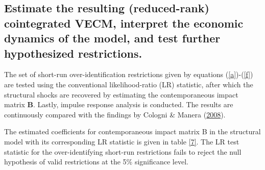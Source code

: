 \documentclass[11pt,preprint, authoryear]{elsarticle}
\numberwithin{equation}{section}
\numberwithin{figure}{section}
\numberwithin{table}{section}
\begin{document}
\hypertarget{estimate-the-resulting-reduced-rank-cointegrated-vecm-interpret-the-economic-dynamics-of-the-model-and-test-further-hypothesized-restrictions.}{%
\subsection{\texorpdfstring{Estimate the resulting (reduced-rank)
cointegrated VECM, interpret the economic dynamics of the model, and
test further hypothesized restrictions.
\label{step4}}{Estimate the resulting (reduced-rank) cointegrated VECM, interpret the economic dynamics of the model, and test further hypothesized restrictions. }}\label{estimate-the-resulting-reduced-rank-cointegrated-vecm-interpret-the-economic-dynamics-of-the-model-and-test-further-hypothesized-restrictions.}}

The set of short-run over-identification restrictions given by equations
(\ref{a})-(\ref{f}) are tested using the conventional likelihood-ratio
(LR) statistic, after which the structural shocks are recovered by
estimating the contemporaneous impact matrix \(\bm{B}\). Lastly, impulse
response analysis is conducted. The results are continuously compared
with the findings by Cologni \& Manera
(\protect\hyperlink{ref-cologni2008}{2008}).

The estimated coefficients for contemporaneous impact matrix B in the
structural model with its corresponding LR statistic is given in table
\ref{7}. The LR test statistic for the over-identifying short-run
restrictions fails to reject the null hypothesis of valid restrictions
at the 5\% significance level.
\end{document}
